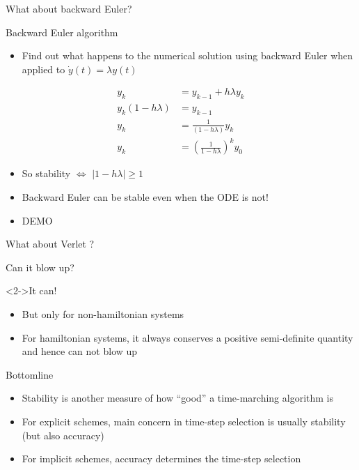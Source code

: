 \documentclass[presentation]{beamer}
\newcommand{\abs}[1]{\left\lvert#1\right\rvert}
\begin{document}
\begin{frame}[label={sec:org8f893b0}]{What about backward Euler?}
\begin{block}{Backward Euler algorithm}
\begin{itemize}
\item Find out what happens to the numerical solution using backward Euler when applied to
\(\dot{y}(t) = \lambda y(t)\)
\end{itemize}
\begin{equation*}
\begin{aligned} y_k & = y_{k-1} + h \lambda y_{k} \\
y_k (1 - h \lambda) &= y_{k-1} \\
y_k &= \frac{1}{(1 - h \lambda)}y_{k} \\
y_k &= \left( \frac{1}{1 - h \lambda} \right)^k y_{0}
\end{aligned}
\end{equation*}
\begin{itemize}
\item So stability \(\Leftrightarrow\) \(\abs{1 - h \lambda} \geq 1\)
\item Backward Euler can be stable even when the ODE is not!
\item \alert{DEMO}
\end{itemize}
\end{block}
\end{frame}
\begin{frame}[label={sec:orgc2f6c51}]{What about Verlet ?}
\begin{block}{Can it blow up?}
\end{block}
\begin{block}<2->{It can!}
\begin{itemize}
\item But only for non-hamiltonian systems
\item For hamiltonian systems, it always conserves a positive semi-definite
quantity and hence can not blow up
\end{itemize}
\end{block}
\end{frame}
\begin{frame}[label={sec:org2e33f8e}]{Bottomline}
\begin{itemize}
\item Stability is another measure of how ``good'' a time-marching algorithm is
\item For \alert{explicit} schemes, main concern in time-step selection is usually
\alert{stability} (but also accuracy)
\item For \alert{implicit} schemes, \alert{accuracy} determines the time-step selection
\end{itemize}
\end{frame}
\end{document}

